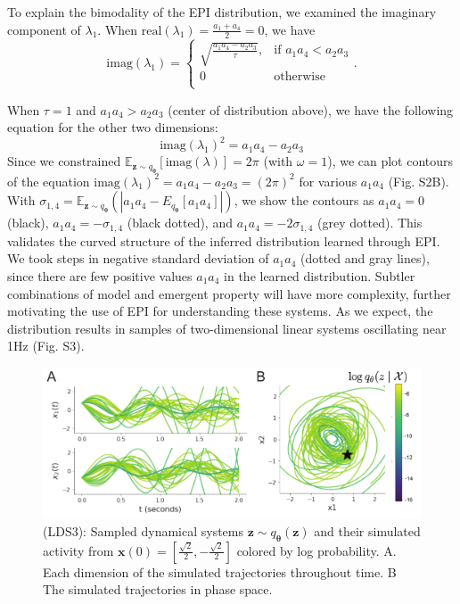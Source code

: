 \documentclass[11pt]{article}
\begin{document}
To explain the bimodality of the EPI distribution, we examined the imaginary component of $\lambda_1$.  When $\text{real}(\lambda_1) = \frac{a_1 + a_4}{2} = 0$, we have
\begin{equation}
\text{imag}(\lambda_1) = \begin{cases}
                             \sqrt{\frac{a_1 a_4 - a_2 a_3}{\tau}},  & \text{if } a_1 a_4 < a_2 a_3 \\
                             0 & \text{otherwise } \\
                         \end{cases}.
\end{equation}

When $\tau=1$ and $a_1 a_4 > a_2 a_3$ (center of distribution above), we have the following equation for the other two dimensions:
\begin{equation}
\text{imag}(\lambda_1)^2 = a_1 a_4 - a_2 a_3
\end{equation}
Since we constrained $\mathbb{E}_{\mathbf{z} \sim q_{\bm{\theta}}}\left[\text{imag}(\lambda)\right] = 2 \pi$ (with $\omega=1$), we can plot contours of the equation $\text{imag}(\lambda_1)^2 = a_1 a_4 - a_2 a_3 = (2 \pi)^2$ for various $a_1 a_4$ (Fig. S2B). 
With $\sigma_{1,4} = \mathbb{E}_{\mathbf{z} \sim q_{\bm{\theta}}}(|a_1 a_4 - E_{q_{\bm{\theta}}}[a_1 a_4]|)$, we show the contours as $a_1 a_4 = 0$ (black), $a_1 a_4 = -\sigma_{1,4}$ (black dotted), and $a_1 a_4 = -2\sigma_{1,4}$ (grey dotted). 
This validates the curved structure of the inferred distribution learned through EPI.  
We took steps in negative standard deviation of $a_1 a_4$ (dotted and gray lines), since there are few positive values $a_1 a_4$ in the learned distribution.  
Subtler combinations of model and emergent property will have more complexity, further motivating the use of EPI for understanding these systems.  
As we expect, the distribution results in samples of two-dimensional linear systems oscillating near 1Hz (Fig. S3).

\begin{figure}
\begin{center}
\includegraphics[scale=0.8]{figures/figLDS3/figLDS3.pdf}
\end{center}
\begin{flushleft}
\caption{\small (LDS3): Sampled dynamical systems $\mathbf{z} \sim q_{\bm{\theta}}(\mathbf{z})$ and their simulated activity from $\mathbf{x}(0) = [\frac{\sqrt{2}}{2}, -\frac{\sqrt{2}}{2}]$ colored by log probability. A. Each dimension of the simulated trajectories throughout time.  
B  The simulated trajectories in phase space.}
\end{flushleft}
\label{fig:LDS3}
\end{figure}
\end{document}

